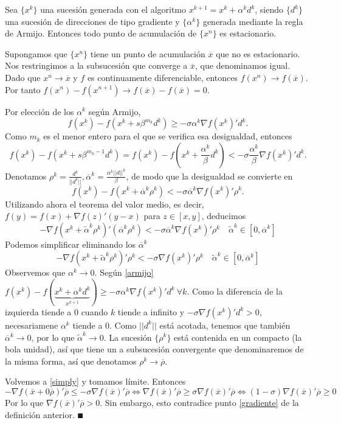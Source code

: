 \documentclass[MIOP.tex]{subfiles}
\begin{document}
\begin{teorema}
Sea $\{x^k\}$ una sucesión generada con el algoritmo $x^{k+1}=x^k+\alpha^kd^k$, siendo $\{d^k\}$ una sucesión de direcciones de tipo gradiente y $\{\alpha^k\}$ generada mediante la regla de Armijo. Entonces todo punto de acumulación de $\{x^n\}$ es estacionario.
\end{teorema}
\begin{dem}
Supongamos que $\{x^n\}$ tiene un punto de acumulación $\overline{x}$ que no es estacionario. Nos restringimos a la subsucesión que converge a $\overline{x}$, que denominamos igual. Dado que $x^n\to \overline{x}$ y $f$ es continuamente diferenciable, entonces $f(x^n)\to f(\overline{x})$. Por tanto $f(x^n)-f(x^{n+1})\to f(\overline{x})-f(\overline{x})=0$. 

Por elección de los $\alpha^k$ según Armijo, 
\begin{equation}\label{armijo}
f(x^k)-f(x^k+s\beta^{m_k}d^k)\geq -\sigma\alpha^k\nabla f(x^k)'d^k.
\end{equation}
 Como $m_k$ es el menor entero para el que se verifica esa desigualdad, entonces 
$$f(x^k)-f(x^k+{s\beta^{m_k-1}}d^k)=f(x^k)-f(x^k+\frac{\alpha^k}{\beta}d^k)<-\sigma\frac{\alpha^k}{\beta}\nabla f(x^k)'d^k.$$ 
Denotamos $\rho^k=\frac{d^k}{||d^k||},\overline{\alpha}^k=\frac{\alpha^k||d||^k}{\beta}$, de modo que la desigualdad se convierte en 
$$ f(x^k)-f(x^k+\overline{\alpha}^k\rho^k)< -\sigma\overline{\alpha}^k\nabla f(x^k)'\rho^k.$$
Utilizando ahora el teorema del valor medio, es decir, $f(y)=f(x)+\nabla f(z)'(y-x)$ para $z\in[x,y]$, deducimos
$$-\nabla f(x^k+\tilde{\alpha}^k\rho^k)'(\overline{\alpha}^k\rho^k) <-\sigma\overline{\alpha}^k\nabla f(x^k)'\rho^k\quad \tilde{\alpha}^k\in[0,\overline{\alpha}^k]$$
Podemos simplificar eliminando los $\overline{\alpha}^k$
\begin{equation}\label{simply}
-\nabla f(x^k+\tilde{\alpha}^k\rho^k)'\rho^k <-\sigma\nabla f(x^k)'\rho^k\quad \tilde{\alpha}^k\in[0,\overline{\alpha}^k]
\end{equation}
Observemos que $\alpha^k\to 0$. Según \ref{armijo}
$f(x^k)-f(\underbrace{x^k+\alpha^kd^k}_{x^{k+1}})\geq -\sigma\alpha^k\nabla f(x^k)'d^k\ \forall k$. Como la diferencia de la izquierda tiende a 0 cuando $k$ tiende a infinito y $-\sigma\nabla f(x^k)'d^k>0$, necesariamene $\alpha^k$ tiende a 0. Como $||d^k||$ está acotada, tenemos que también $\overline{\alpha}^k\to 0$, por lo que $\tilde{\alpha}^k\to 0$. La sucesión $\{\rho^k\}$ está contenida en un compacto (la bola unidad), así que tiene un a subsucesión convergente que denominaremos de la misma forma, así que denotamos $\rho^k\to\overline{\rho}$. 

Volvemos a \ref{simply} y tomamos límite. Entonces
$$-\nabla f(\overline{x}+0\overline{\rho})'\overline{\rho}\leq-\sigma\nabla f(\overline{x})'\overline{\rho} \Longleftrightarrow \nabla f(\overline{x})'\overline{\rho}\geq\sigma\nabla f(\overline{x})'\overline{\rho} \Longleftrightarrow (1-\sigma)\nabla f(\overline{x})'\overline{\rho}\geq 0$$
Por lo que $\nabla f(\overline{x})'\overline{\rho}>0$. Sin embargo, esto contradice punto \ref{gradiente} de la definición anterior. 
$\QED$
\end{dem}
\end{document}
